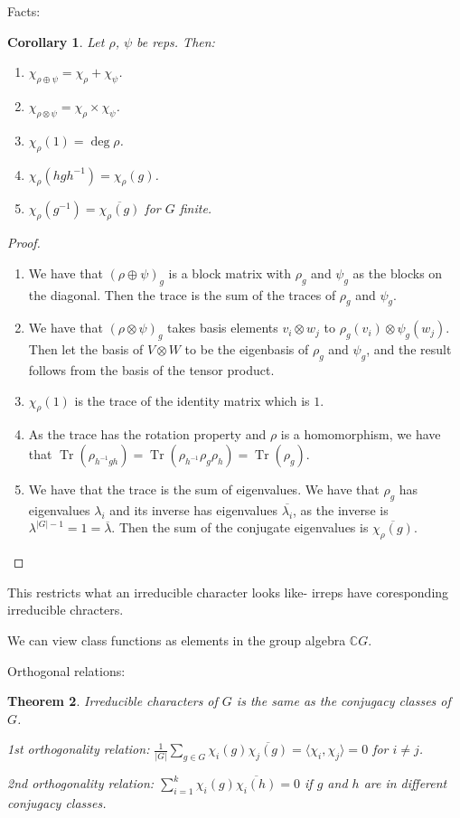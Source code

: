 \documentclass[]{report}
\newtheorem{theorem}{Theorem}
\newtheorem{corollary}[theorem]{Corollary}
\theoremstyle{definition}
\numberwithin{theorem}{section}
\numberwithin{equation}{section}
\newcommand{\tr}{\operatorname{Tr}}
\begin{document}
Facts:
\begin{corollary}
	Let $\rho$, $\psi$ be reps. Then:
	\begin{enumerate}
		\item $\chi_{\rho \oplus \psi} = \chi_\rho + \chi_\psi$.
		\item $\chi_{\rho \otimes \psi} = \chi_\rho \times \chi_\psi$. 
		\item $\chi_\rho(1) = \deg \rho$. 
		\item $\chi_\rho(h g h^{-1}) = \chi_\rho(g)$.
		\item $\chi_\rho(g^{-1}) = \overline{\chi_\rho(g)}$ for $G$ finite. 
	\end{enumerate}
\end{corollary}
\begin{proof}
	\begin{enumerate}
		\item We have that $(\rho \oplus \psi)_g$ is a block matrix with $\rho_g$ and $\psi_g$ as the blocks on the diagonal. Then the trace is the sum of the traces of $\rho_g$ and $\psi_g$. 
		\item We have that $(\rho \otimes \psi)_g$ takes basis elements $v_i \otimes w_j$ to $\rho_g(v_i) \otimes \psi_g(w_j)$. Then let the basis of $V \otimes W$ to be the eigenbasis of $\rho_g$ and $\psi_g$, and the result follows from the basis of the tensor product.
		\item $\chi_\rho(1)$ is the trace of the identity matrix which is $1$. 
		\item As the trace has the rotation property and $\rho$ is a homomorphism, we have that $\tr(\rho_{h^{-1} g h}) = \tr(\rho_{h^{-1}} \rho_g \rho_h) = \tr( \rho_g)$. 
		\item We have that the trace is the sum of eigenvalues. We have that $\rho_g$ has eigenvalues $\lambda_i$ and its inverse has eigenvalues $\overline{\lambda_i}$, as the inverse is $\lambda^{|G| - 1} = 1 = \overline{\lambda}$. Then the sum of the conjugate eigenvalues is $\overline{\chi_\rho(g)}$. 
	\end{enumerate}
\end{proof}
This restricts what an irreducible character looks like- irreps have coresponding irreducible chracters. 

We can view class functions as elements in the group algebra $\mathbb{C}G$.

Orthogonal relations:
\begin{theorem}
	Irreducible characters of $G$ is the same as the conjugacy classes of $G$. 
	
	1st orthogonality relation:
	$\frac{1}{|G|} \sum_{g \in G} \chi_i(g) \overline{\chi_j(g)} = \langle \chi_i, \chi_j \rangle = 0$ for $i \neq j$.
	
	2nd orthogonality relation:
	$\sum_{i = 1}^{k} \chi_i(g) \overline{\chi_i(h)} = 0$ if $g$ and $h$ are in different conjugacy classes. 
\end{theorem}
\end{document}
